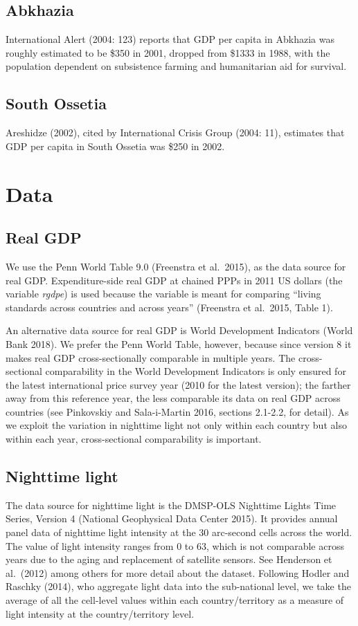 \documentclass[12pt,a4paper]{article}%
\begin{document}
 \subsection{Abkhazia}
 International Alert (2004: 123) reports that GDP per capita in Abkhazia was roughly estimated to be \$350 in 2001, dropped from \$1333 in 1988, with the population dependent on subsistence farming and humanitarian aid for survival.
 
 \subsection{South Ossetia}
 Areshidze (2002), cited by International Crisis Group (2004: 11), estimates that GDP per capita in South Ossetia was \$250 in 2002.

\section{Data}
\subsection{Real GDP}
We use the Penn World Table 9.0 (Freenstra et al.\ 2015), as the data source for real GDP. 
Expenditure-side real GDP at chained PPPs in 2011 US dollars (the variable \textit{rgdpe}) is used because the variable is meant for comparing ``living standards across countries and across years'' (Freenstra et al.\ 2015, Table 1).

An alternative data source for real GDP is World Development Indicators (World Bank 2018). 
We prefer the Penn World Table, however, because since version 8 it makes real GDP cross-sectionally comparable in multiple years. 
The cross-sectional comparability in the World Development Indicators is only ensured for the latest international price survey year (2010 for the latest version); the farther away from this reference year, the less comparable its data on real GDP across countries (see Pinkovskiy and Sala-i-Martin 2016, sections 2.1-2.2, for detail).
As we exploit the variation in nighttime light not only within each country but also within each year, cross-sectional comparability is important.

\subsection{Nighttime light}
The data source for nighttime light is the DMSP-OLS Nighttime Lights Time Series, Version 4 (National Geophysical Data Center 2015). 
It provides annual panel data of nighttime light intensity at the 30 arc-second cells across the world. 
The value of light intensity ranges from 0 to 63, which is not comparable across years due to the aging and replacement of satellite sensors. 
See Henderson et al.\ (2012) among others for more detail about the dataset.
Following Hodler and Raschky (2014), who aggregate light data into the sub-national level, we take the average of all the cell-level values within each country/territory as a measure of light intensity at the country/territory level.
\end{document}
